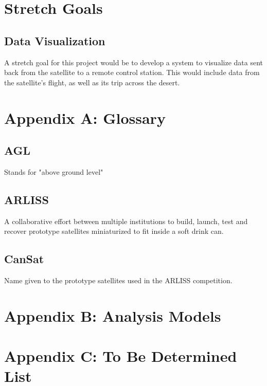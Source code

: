 \documentclass{scrreprt}
\begin{document}
\section{Stretch Goals}
\subsection{Data Visualization}
A stretch goal for this project would be to develop a system to visualize data sent back from the satellite to a remote control station. This would include data from the satellite's flight, as well as its trip across the desert.

\section{Appendix A: Glossary}

\subsection{AGL}
Stands for "above ground level"

\subsection{ARLISS}
A collaborative effort between multiple institutions to build, launch, test and recover
prototype satellites miniaturized to fit inside a soft drink can.

\subsection{CanSat}
Name given to the prototype satellites used in the ARLISS competition.



\section{Appendix B: Analysis Models}


\section{Appendix C: To Be Determined List}
\end{document}
